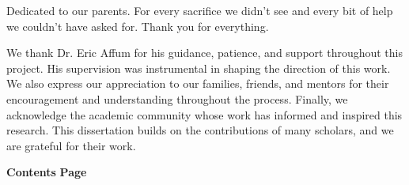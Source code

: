 \documentclass[12pt, onehalfspacing, liststotoc, oneside, parskip, headsepline]{UMaT_Undergrauate_Report_Template_Configurations} %
\begin{document}
\begin{dedication}
  \vspace{10pt}
  \centering
  Dedicated to our parents. For every sacrifice we didn’t see and every bit of help we couldn't have asked for. Thank you for everything.
\end{dedication}



\begin{acknowledgements}
  \addchaptertocentry{\acknowledgementname}
  \vspace{0.5cm}
  We thank Dr. Eric Affum for his guidance, patience, and support throughout this project. His supervision was instrumental in shaping the direction of this work. We also express our appreciation to our families, friends, and mentors for their encouragement and understanding throughout the process. Finally, we acknowledge the academic community whose work has informed and inspired this research. This dissertation builds on the contributions of many scholars, and we are grateful for their work.
\end{acknowledgements}
\pagebreak


\vspace*{60pt}
\vspace{10pt}
\renewcommand{\contentsname}{\hfill\large\bfseries TABLE OF CONTENTS\hfill} %
\vspace{-5ex} %

\textbf{Contents} \hspace{0.84\textwidth} \textbf{Page}

\vspace*{-4cm} %
\end{document}
